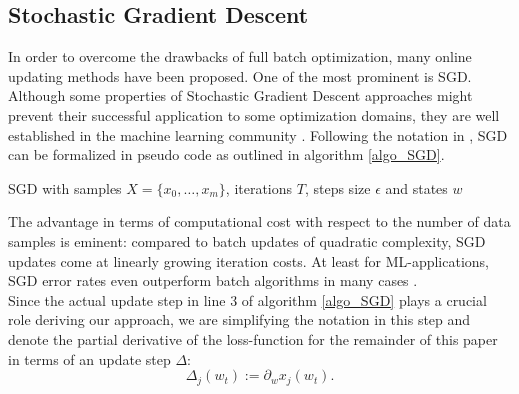\documentclass{acm_proc_article-sp}
\begin{document}
\subsection{Stochastic Gradient Descent}
In order to overcome the drawbacks of full batch optimization, many online 
updating methods have been proposed. One of the most prominent is SGD.
Although some properties of Stochastic Gradient Descent approaches might  
prevent their successful application to some optimization 
domains, they are well established in the machine learning community 
\cite{bottou2010large}.   
Following the notation in \cite{SGDsmola}, SGD can be formalized
in pseudo code as outlined in algorithm \ref{algo_SGD}. 
\begin{algorithm}
\caption{SGD with samples $X=\{x_0,\dots,x_m\}$, iterations $T$, steps size 
$\epsilon$ and states $w$}
\label{algo_SGD}
\begin{algorithmic}[1]
\EndFor
{}
\end{algorithmic}
\end{algorithm}
The advantage in terms of computational cost with respect to the number of data 
samples is eminent: 
compared to batch updates of quadratic complexity,
SGD updates come at linearly growing iteration costs. At least for ML-applications, 
SGD error rates even outperform batch algorithms in many cases \cite{bottou2010large}.\\  

Since the actual update step in line $3$ of algorithm \ref{algo_SGD} plays a 
crucial role deriving our approach, we are simplifying the notation in this
step and denote the partial derivative of the loss-function for the remainder 
of this paper in terms of
an update step $\Delta$: 
\begin{equation}
\Delta_j(w_t) := \partial_wx_j(w_{t}). 
\end{equation}
\end{document}

